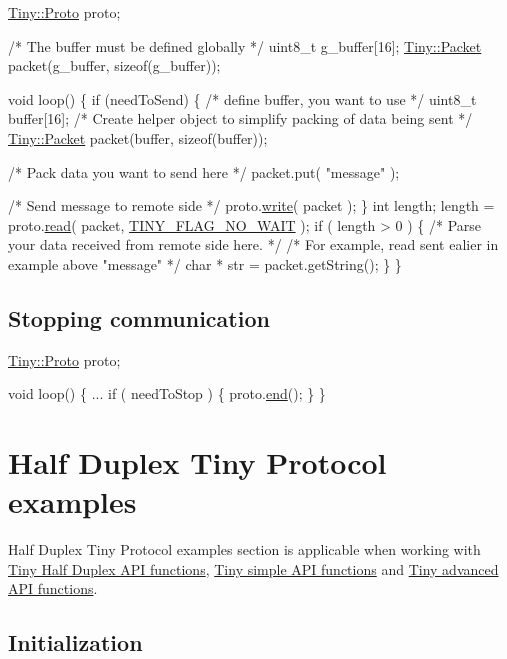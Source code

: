 \begin{DoxyCode}
\hyperlink{classTiny_1_1Proto}{Tiny::Proto} proto;

\textcolor{comment}{/* The buffer must be defined globally */}
uint8\_t g\_buffer[16];
\hyperlink{classTiny_1_1Packet}{Tiny::Packet} packet(g\_buffer, \textcolor{keyword}{sizeof}(g\_buffer));

\textcolor{keywordtype}{void} loop()
\{
    \textcolor{keywordflow}{if} (needToSend)
    \{
        \textcolor{comment}{/* define buffer, you want to use */}
        uint8\_t buffer[16];
        \textcolor{comment}{/* Create helper object to simplify packing of data being sent */}
        \hyperlink{classTiny_1_1Packet}{Tiny::Packet} packet(buffer, \textcolor{keyword}{sizeof}(buffer));

        \textcolor{comment}{/* Pack data you want to send here */}
        packet.put( \textcolor{stringliteral}{"message"} );

        \textcolor{comment}{/* Send message to remote side */}
        proto.\hyperlink{classTiny_1_1Proto_a46fbc8b8681431b9b0a9a4b953a8dc33}{write}( packet );
    \}
    \textcolor{keywordtype}{int} length;
    length = proto.\hyperlink{classTiny_1_1Proto_acc00ac10509eaa11a83b0b88a2278b3e}{read}( packet, \hyperlink{group__FLAGS__GROUP_gadadd60eb21d7949e6d097ad36aab9b2e}{TINY\_FLAG\_NO\_WAIT} );
    \textcolor{keywordflow}{if} ( length > 0 )
    \{
        \textcolor{comment}{/* Parse your data received from remote side here. */}
        \textcolor{comment}{/* For example, read sent ealier in example above "message" */}
        \textcolor{keywordtype}{char} * str = packet.getString();
    \}
\}
\end{DoxyCode}
\hypertarget{arduino_arduino_tiny_close}{}\subsection{Stopping communication}\label{arduino_arduino_tiny_close}

\begin{DoxyCode}
\hyperlink{classTiny_1_1Proto}{Tiny::Proto} proto;

\textcolor{keywordtype}{void} loop()
\{
    ...
    \textcolor{keywordflow}{if} ( needToStop )
    \{
        proto.\hyperlink{classTiny_1_1Proto_ae9f52fa1c4f18981672ad7af12633d4e}{end}();
    \}
\}
\end{DoxyCode}
\hypertarget{arduino_arduino_tiny_hd}{}\section{Half Duplex Tiny Protocol examples}\label{arduino_arduino_tiny_hd}
Half Duplex Tiny Protocol examples section is applicable when working with \hyperlink{group__HALF__DUPLEX__API}{Tiny Half Duplex A\+P\+I functions}, \hyperlink{group__SIMPLE__API}{Tiny simple A\+P\+I functions} and \hyperlink{group__ADVANCED__API}{Tiny advanced A\+P\+I functions}.\hypertarget{arduino_arduino_tiny_hd_init}{}\subsection{Initialization}\label{arduino_arduino_tiny_hd_init}

